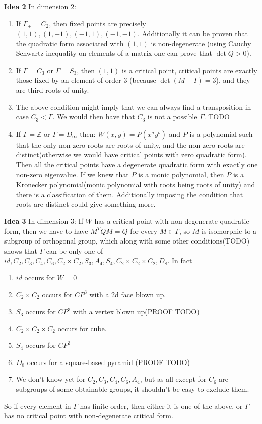 \documentclass[a4paper]{article}
\begin{document}
\textbf{Idea 2}
In dimension $2$:
\begin{enumerate}
	\item If $\Gamma_+ = C_2$, then fixed points are precisely $(1,1), (1,-1), (-1,1), (-1, -1)$. Additionally it can be proven that the quadratic form associated with $(1,1)$ is non-degenerate (using Cauchy Schwartz inequality on elements of a matrix one can prove that $\det Q > 0$).
	\item If $\Gamma = C_3$ or $\Gamma = S_3$, then $(1,1)$ is a critical point, critical points are exactly those fixed by an element of order $3$ (because $\det(M-I) = 3$), and they are third roots of unity.
	\item The above condition might imply that we can always find a transposition in case $C_3 < \Gamma$. We would then have that $C_3$ is not a possible $\Gamma$. TODO
	\item If $\Gamma = \mathbb{Z}$ or $\Gamma = D_\infty$ then:
	$W(x, y) = P(x^a y^b)$ and $P$ is a polynomial such that the only non-zero roots are roots of unity, and the non-zero roots are distinct(otherwise we would have critical points with zero quadratic form). Then all the critical points have a degenerate quadratic form with exactly one non-zero eigenvalue.
	If we knew that $P$ is a monic polynomial, then $P$ is a Kronecker polynomial(monic polynomial with roots being roots of unity) and there is a classification of them. Additionally imposing the condition that roots are distinct could give something more.
\end{enumerate}
\textbf{Idea 3}
In dimension 3:
If $W$ has a critical point with non-degenerate quadratic form, then we have to have $M^T Q M = Q$ for every $M \in \Gamma$, so $M$ is isomorphic to a subgroup of orthogonal group, which along with some other conditions(TODO) shows that $\Gamma$ can be only one of $id, C_2, C_3, C_4, C_6, C_2 \times C_2, S_3, A_4, S_4, C_2 \times C_2 \times C_2, D_8$. In fact
\begin{enumerate}
	\item $id$ occurs for $W = 0$
	\item $C_2 \times C_2$ occurs for $CP^3$ with a 2d face blown up.
	\item $S_3$ occurs for $CP^3$ with a vertex blown up(PROOF TODO)
	\item $C_2 \times C_2 \times C_2$ occurs for cube.
	\item $S_4$ occurs for $CP^3$
	\item $D_8$ occurs for a square-based pyramid (PROOF TODO)
	\item We don't know yet for $C_2, C_3, C_4, C_6, A_4$, but as all except for $C_6$ are subgroups of some obtainable groups, it shouldn't be easy to exclude them.
\end{enumerate}
So if every element in $\Gamma$ has finite order, then either it is one of the above, or $\Gamma$ has no critical point with non-degenerate critical form.
\end{document}
